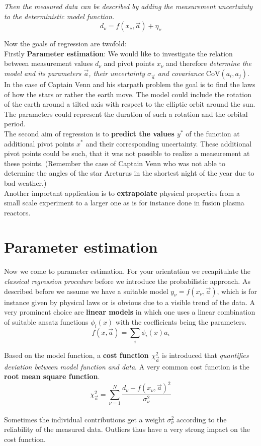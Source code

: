 \documentclass[12pt, a4paper]{scrartcl}
\begin{document}
\textit{Then the measured data can be described by adding the measurement uncertainty to the deterministic 
model function.}\[d_{\nu}=f(x_{\nu},\vec{a})+\eta_{\nu}\]


Now the goals of regression are twofold:\\

Firstly \textbf{Parameter estimation}: We would like to investigate the relation between 
measurement values $d_{\nu}$ and pivot points $x_{\nu}$ and therefore \textit{determine
the model and its parameters $\vec{a}$, their uncertainty $\sigma_{\vec{a}}$ and covariance $\text{CoV}(a_i,a_j)$}. 
In the case of Captain Venn and his starpath problem the goal is to find 
the laws of how the stars or rather the earth move. The model could
include the rotation of the earth around a tilted axis with respect to
the elliptic orbit around the sun. The parameters could represent the
duration of such a rotation and the orbital period.\\

The second aim of regression is to \textbf{predict the values $y^*$} of the function at
additional pivot points $x^*$ and their corresponding uncertainty. These
additional pivot points could be such, that it was not possible to realize
a measurement at these points. (Remember the case of Captain Venn
who was not able to determine the angles of the star Arcturus in the
shortest night of the year due to bad weather.)\\

Another important application is to \textbf{extrapolate} physical properties from a small scale
experiment to a larger one as is for instance done in fusion plasma reactors.\\

\section*{Parameter estimation}
Now we come to parameter estimation.
For your orientation we recapitulate the \textit{classical regression procedure} before
we introduce the probabilistic approach.
As described before we assume we have a suitable model $y_{\nu}=f(x_{\nu},\vec{a})$, which is for instance given by physical 
laws or is obvious due to a visible trend of the data. 
A very prominent choice are \textbf{linear models} in which
one uses a linear combination of suitable ansatz functions $\phi_i (x)$ with
the coefficients being the parameters. 
\[f(x,\vec{a})=\sum_i \phi_i(x)a_i\]

Based on the model function, a \textbf{cost function $\chi^2_{\vec{a}}$} is introduced that \textit{quantifies deviation between 
model function and data}. A very common cost
function is the \textbf{root mean square function}.\\
\begin{equation*}\boxed{\chi^2_{\vec{a}}=\sum_{\nu=1}^N\frac{d_{\nu}-f(x_{\nu},\vec{a})^2}{\sigma_{\nu}^2}
}\end{equation*}\\
 Sometimes the individual contributions get a weight $\sigma_{\nu}^2$
according to the reliability of the measured data.
Outliers thus have a very strong impact on the cost function.\\
\end{document}
